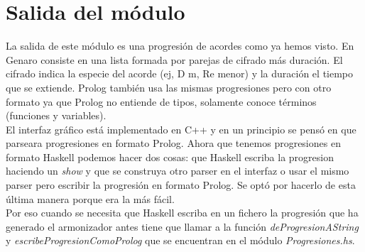 \documentclass[a4paper]{report}
\begin{document}
\normalsize

\section{Salida del m\'odulo}
La salida de este m\'odulo es una progresi\'on de acordes como ya hemos visto.
En Genaro consiste en una lista formada por parejas de cifrado m\'as
duraci\'on. El cifrado indica la especie del acorde (ej, D m, Re menor)
y la duraci\'on el tiempo que se extiende. Prolog tambi\'en usa las mismas
progresiones pero con otro formato ya que Prolog no entiende de tipos,
solamente conoce t\'erminos (funciones y variables).\\
\indent El interfaz gr\'afico
est\'a implementado en C++ y en un principio se pens\'o en que parseara
progresiones en formato Prolog. Ahora que tenemos progresiones en formato
Haskell podemos hacer dos cosas: que Haskell escriba la progresion haciendo
un \emph{show} y que se construya otro parser en el interfaz o usar el mismo
parser pero escribir la progresi\'on en formato Prolog. Se opt\'o por hacerlo
de esta \'ultima manera porque era la m\'as f\'acil.\\
\indent Por eso cuando se necesita que Haskell escriba en un fichero la progresi\'on
que ha generado el armonizador antes tiene que llamar a la funci\'on 
\emph{deProgresionAString} y \emph{escribeProgresionComoProlog} que se encuentran
en el m\'odulo \emph{Progresiones.hs}.
\end{document}
